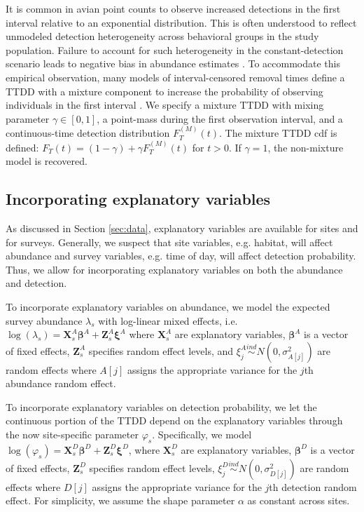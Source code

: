 \documentclass[12pt]{article}
\newcommand{\vX}{\textbf{X}}
\newcommand{\vZ}{\textbf{Z}}
\newcommand{\vbeta}{\boldsymbol{\beta}}
\newcommand{\vxi}{\boldsymbol{\xi}}
\newcommand{\ind}{\stackrel{ind}{\sim}}
\newcommand{\Fm}{F_T^{(M)}}
\begin{document}
It is common in avian point counts to observe increased detections in the first interval relative to an exponential distribution.
This is often understood to reflect unmodeled detection heterogeneity across behavioral groups in the study population.
Failure to account for such heterogeneity in the constant-detection scenario leads to negative bias in abundance estimates \citep{Otis1978}.
To accommodate this empirical observation, many models of interval-censored removal times define a TTDD with a mixture component to increase the probability of observing individuals in the first interval \citep{Farnsworth2002, Royle2004Generalized, Farnsworth2005, Alldredge2007, Etterson2009, Reidy2011}.
We specify a mixture TTDD with mixing parameter $\gamma\in[0,1]$, a point-mass during the first observation interval, and a continuous-time detection distribution $\Fm(t)$.  
The mixture TTDD cdf is defined: $F_T(t) = (1-\gamma) + \gamma \Fm(t)$ for $t>0$.
If $\gamma=1$, the non-mixture model is recovered.





\subsection{Incorporating explanatory variables}\label{sec:covariates}

As discussed in Section \ref{sec:data}, explanatory variables are available for sites and for surveys. 
Generally, we suspect that site variables, e.g. habitat, will affect abundance and survey variables, e.g. time of day, will affect detection probability. 
Thus, we allow for incorporating explanatory variables on both the abundance and detection.

To incorporate explanatory variables on abundance, we model the expected survey abundance $\lambda_{s}$ with log-linear mixed effects, i.e. $\log (\lambda_{s}) = \vX_{s}^A\vbeta^A + \vZ_{s}^A\vxi^A$ where $\vX_{s}^A$ are explanatory variables, $\vbeta^A$ is a vector of fixed effects, $\vZ_{s}^A$ specifies random effect levels, and $\xi_j^A \ind N(0,\sigma_{A[j]}^2)$ are random effects where $A[j]$ assigns the appropriate variance for the $j$th abundance random effect.  

To incorporate explanatory variables on detection probability, we let the continuous portion of the TTDD depend on the explanatory variables through the now site-specific parameter $\varphi_s$. 
Specifically, we model $\log(\varphi_{s}) = \vX_{s}^D\vbeta^D + \vZ_{s}^D\vxi^D$, where $\vX_{s}^D$ are explanatory variables, $\vbeta^D$ is a vector of fixed effects, $\vZ_{s}^D$ specifies random effect levels, $\xi_j^D \ind N(0,\sigma_{D[j]}^2)$ are random effects where $D[j]$ assigns the appropriate variance for the $j$th detection random effect.  
For simplicity, we assume the shape parameter $\alpha$ as constant across sites.
\end{document}

